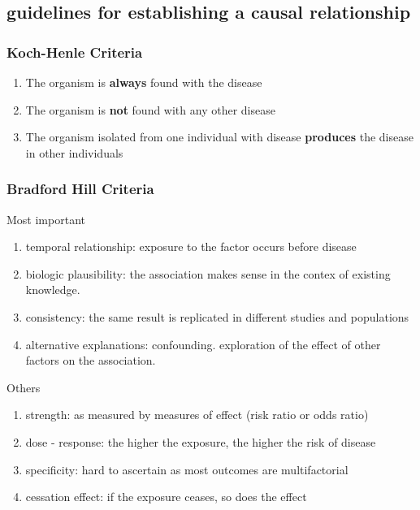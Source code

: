 \documentclass[
]{article}
\begin{document}
\hypertarget{guidelines-for-establishing-a-causal-relationship}{%
\subsection{guidelines for establishing a causal
relationship}\label{guidelines-for-establishing-a-causal-relationship}}

\hypertarget{koch-henle-criteria}{%
\subsubsection{Koch-Henle Criteria}\label{koch-henle-criteria}}

\begin{enumerate}
\def\labelenumi{\arabic{enumi}.}
\item
  The organism is \textbf{always} found with the disease
\item
  The organism is \textbf{not} found with any other disease
\item
  The organism isolated from one individual with disease
  \textbf{produces} the disease in other individuals
\end{enumerate}

\hypertarget{bradford-hill-criteria}{%
\subsubsection{Bradford Hill Criteria}\label{bradford-hill-criteria}}

Most important

\begin{enumerate}
\def\labelenumi{\arabic{enumi}.}
\item
  temporal relationship: exposure to the factor occurs before disease
\item
  biologic plausibility: the association makes sense in the contex of
  existing knowledge.
\item
  consistency: the same result is replicated in different studies and
  populations
\item
  alternative explanations: confounding. exploration of the effect of
  other factors on the association.
\end{enumerate}

Others

\begin{enumerate}
\def\labelenumi{\arabic{enumi}.}
\setcounter{enumi}{4}
\item
  strength: as measured by measures of effect (risk ratio or odds ratio)
\item
  dose - response: the higher the exposure, the higher the risk of
  disease
\item
  specificity: hard to ascertain as most outcomes are multifactorial
\item
  cessation effect: if the exposure ceases, so does the effect
\end{enumerate}
\end{document}

